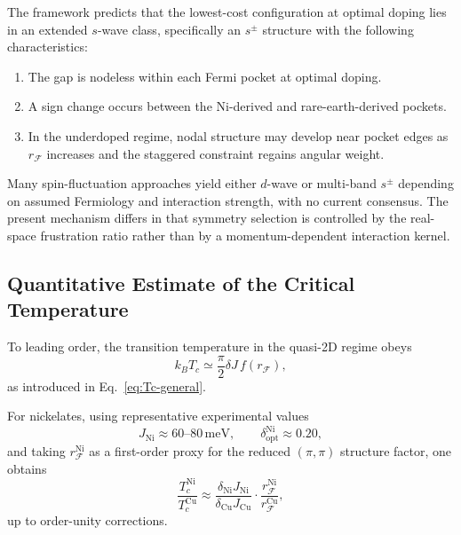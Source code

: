     The framework predicts that
    the lowest-cost configuration at optimal doping
    lies in an extended $s$-wave class,
    specifically an $s^\pm$ structure
    with the following characteristics:

    \begin{enumerate}
      \item
      The gap is nodeless within each Fermi pocket
      at optimal doping.

      \item
      A sign change occurs between
      the Ni-derived and rare-earth-derived pockets.

      \item
      In the underdoped regime,
      nodal structure may develop near pocket edges
      as $r_{\mathcal F}$ increases
      and the staggered constraint regains angular weight.
    \end{enumerate}

    Many spin-fluctuation approaches yield
    either $d$-wave or multi-band $s^\pm$
    depending on assumed Fermiology
    and interaction strength,
    with no current consensus.
    The present mechanism differs in that
    symmetry selection is controlled
    by the real-space frustration ratio
    rather than by a momentum-dependent interaction kernel.

  \subsection{Quantitative Estimate of the Critical Temperature}
    \label{subsec:nickelates-tc}

    To leading order,
    the transition temperature in the quasi-2D regime
    obeys
    \begin{equation}
      k_B T_c
      \simeq
      \frac{\pi}{2}
      \delta J
      \, f(r_{\mathcal F}),
    \end{equation}
    as introduced in Eq.~\ref{eq:Tc-general}.

    For nickelates,
    using representative experimental values
    \begin{equation}
      J_{\mathrm{Ni}}
      \approx
      60\text{--}80 \,\mathrm{meV},
      \qquad
      \delta_{\mathrm{opt}}^{\mathrm{Ni}}
      \approx
      0.20,
    \end{equation}
    and taking
    $r_{\mathcal F}^{\mathrm{Ni}}$
    as a first-order proxy
    for the reduced $(\pi,\pi)$ structure factor,
    one obtains
    \begin{equation}
      \frac{T_c^{\mathrm{Ni}}}{T_c^{\mathrm{Cu}}}
      \approx
      \frac{\delta_{\mathrm{Ni}} J_{\mathrm{Ni}}}
      {\delta_{\mathrm{Cu}} J_{\mathrm{Cu}}}
      \cdot
      \frac{
        r_{\mathcal F}^{\mathrm{Ni}}
      }{
        r_{\mathcal F}^{\mathrm{Cu}}
      },
    \end{equation}
    up to order-unity corrections.

